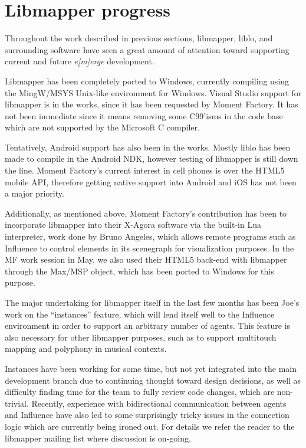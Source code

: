 \documentclass{article}
\newcommand{\emerge}{\emph{e[m]erge}\xspace}
\begin{document}
\section{Libmapper progress}

Throughout the work described in previous sections, libmapper, liblo,
and surrounding software have seen a great amount of attention toward
supporting current and future \emerge development.

Libmapper has been completely ported to Windows, currently compiling
using the MingW/MSYS Unix-like environment for Windows.
Visual Studio support for libmapper is in the works, since it has been
requested by Moment Factory.
It has not been immediate since it means removing some C99'isms in the
code base which are not supported by the Microsoft C compiler.

Tentatively, Android support has also been in the works.
Mostly liblo has been made to compile in the Android NDK, however
testing of libmapper is still down the line.
Moment Factory's current interest in cell phones is over the HTML5
mobile API, therefore getting native support into Android and iOS has
not been a major priority.

Additionally, as mentioned above, Moment Factory's contribution has
been to incorporate libmapper into their X-Agora software via the
built-in Lua interpreter, work done by Bruno Angeles, which allows
remote programs such as Influence to control elements in its
scenegraph for visualization purposes.
In the MF work session in May, we also used their HTML5 back-end with
libmapper through the Max/MSP object, which has been ported to Windows
for this purpose.

The major undertaking for libmapper itself in the last few months has
been Joe's work on the ``instances'' feature, which will lend itself
well to the Influence environment in order to support an arbitrary
number of agents.
This feature is also necessary for other libmapper purposes, such as
to support multitouch mapping and polyphony in musical contexts.

Instances have been working for some time, but not yet integrated into
the main development branch due to continuing thought toward design
decisions, as well as difficulty finding time for the team to fully
review code changes, which are non-trivial.
Recently, experience with bidirectional communication between agents
and Influence have also led to some surprisingly tricky issues in the
connection logic which are currently being ironed out.
For details we refer the reader to the libmapper mailing list where
discussion is on-going.
\end{document}
